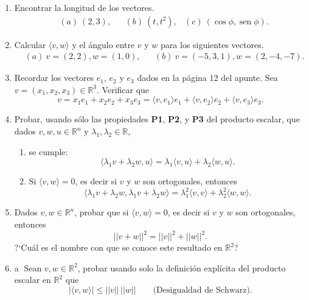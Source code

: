 \begin{enumerate}[topsep=6pt, itemsep=.4cm]
\item Encontrar la longitud de los vectores.
\begin{align*}
&(a) \ (2,3), && (b) \ (t,t^2), & (c) \ (\cos\phi,\operatorname{sen}\phi).
\end{align*}


\item Calcular $\langle v , w  \rangle$ y el ángulo entre $v$ y $w$  para los siguientes vectores.
\begin{align*}
&(a) \ v=(2,2), w=(1,0), &&  (b) \  v=(-5,3,1), w=(2,-4,-7).
\end{align*}


\item Recordar los vectores $e_1$, $e_2$ y $e_3$ dados en la página 12 del apunte. Sea $v=(x_1,x_2,x_3)\in\mathbb{R}^3$.  Verificar que
$$v=x_1e_1+x_2e_2+x_3e_3=\langle v,e_1\rangle e_1+\langle v,e_2\rangle e_2+\langle v,e_3\rangle e_3.$$


\item Probar, usando sólo las propiedades \textbf{P1}, \textbf{P2}, y \textbf{P3} del producto escalar, que dados $v, w, u \in \mathbb R^n$ y $\lambda_1, \lambda_2 \in \mathbb R$,
\begin{enumerate}
    \item se cumple:
    \begin{equation*}
    \langle \lambda_1 v + \lambda_2 w , u  \rangle =  \lambda_1\langle v , u  \rangle +   \lambda_2\langle w , u  \rangle.
    \end{equation*}
    \item Si $\langle v , w  \rangle =0$, es decir si $v$ y $w$ son ortogonales,  entonces
    \begin{equation*}
        \langle \lambda_1 v + \lambda_2 w ,  \lambda_1 v + \lambda_2 w   \rangle =
        \lambda_1^2 \langle  v ,  v  \rangle + \lambda_2^2 \langle w,w  \rangle.
    \end{equation*}
\end{enumerate}



\item Dados $v, w\in \mathbb R^n$, probar que si  $\langle v , w  \rangle =0$, es decir si $v$ y $w$ son ortogonales,  entonces
    \begin{equation*}
    ||v + w||^2 = ||v||^2 + ||w||^2.
    \end{equation*}
    ?`Cuál es el nombre con que se conoce este resultado en $\mathbb R^2$?


\item\label{Schwarz} \textcircled{a} Sean $v,w\in \mathbb R^2$, probar usando  solo la definición explícita del producto escalar en $\mathbb R^2$ que
\begin{equation*}
    |\langle v , w  \rangle| \le ||v||\,||w|| \qquad \text{(Desigualdad de Schwarz).}
\end{equation*}

\end{enumerate}

